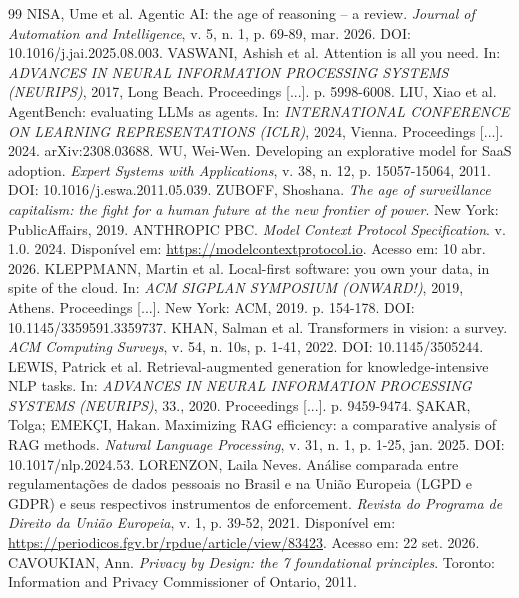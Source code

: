 \postextual
\begin{thebibliography}{99}
 NISA, Ume et al. Agentic AI: the age of reasoning -- a review. \textit{Journal of Automation and Intelligence}, v. 5, n. 1, p. 69-89, mar. 2026. DOI: 10.1016/j.jai.2025.08.003.
 VASWANI, Ashish et al. Attention is all you need. In: \textit{ADVANCES IN NEURAL INFORMATION PROCESSING SYSTEMS (NEURIPS)}, 2017, Long Beach. Proceedings [...]. p. 5998-6008.
 LIU, Xiao et al. AgentBench: evaluating LLMs as agents. In: \textit{INTERNATIONAL CONFERENCE ON LEARNING REPRESENTATIONS (ICLR)}, 2024, Vienna. Proceedings [...]. 2024. arXiv:2308.03688.
 WU, Wei-Wen. Developing an explorative model for SaaS adoption. \textit{Expert Systems with Applications}, v. 38, n. 12, p. 15057-15064, 2011. DOI: 10.1016/j.eswa.2011.05.039.
 ZUBOFF, Shoshana. \textit{The age of surveillance capitalism: the fight for a human future at the new frontier of power}. New York: PublicAffairs, 2019.
 ANTHROPIC PBC. \textit{Model Context Protocol Specification}. v. 1.0. 2024. Disponível em: \url{https://modelcontextprotocol.io}. Acesso em: 10 abr. 2026.
 KLEPPMANN, Martin et al. Local-first software: you own your data, in spite of the cloud. In: \textit{ACM SIGPLAN SYMPOSIUM (ONWARD!)}, 2019, Athens. Proceedings [...]. New York: ACM, 2019. p. 154-178. DOI: 10.1145/3359591.3359737.
 KHAN, Salman et al. Transformers in vision: a survey. \textit{ACM Computing Surveys}, v. 54, n. 10s, p. 1-41, 2022. DOI: 10.1145/3505244.
 LEWIS, Patrick et al. Retrieval-augmented generation for knowledge-intensive NLP tasks. In: \textit{ADVANCES IN NEURAL INFORMATION PROCESSING SYSTEMS (NEURIPS)}, 33., 2020. Proceedings [...]. p. 9459-9474.
 ŞAKAR, Tolga; EMEKÇI, Hakan. Maximizing RAG efficiency: a comparative analysis of RAG methods. \textit{Natural Language Processing}, v. 31, n. 1, p. 1-25, jan. 2025. DOI: 10.1017/nlp.2024.53.
 LORENZON, Laila Neves. Análise comparada entre regulamentações de dados pessoais no Brasil e na União Europeia (LGPD e GDPR) e seus respectivos instrumentos de enforcement. \textit{Revista do Programa de Direito da União Europeia}, v. 1, p. 39-52, 2021. Disponível em: \url{https://periodicos.fgv.br/rpdue/article/view/83423}. Acesso em: 22 set. 2026.
 CAVOUKIAN, Ann. \textit{Privacy by Design: the 7 foundational principles}. Toronto: Information and Privacy Commissioner of Ontario, 2011.

\end{thebibliography}
